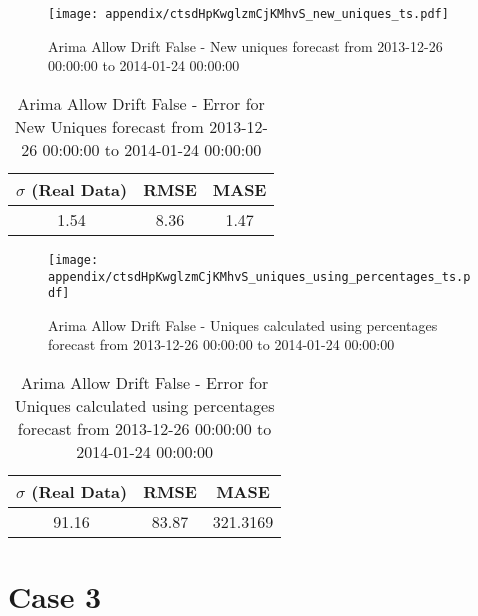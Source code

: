 \begin{figure}[H] \begin{center} \leavevmode
\texttt{[image: appendix/ctsdHpKwglzmCjKMhvS\_new\_uniques\_ts.pdf]} \caption{
Arima Allow Drift False - New uniques forecast from 2013-12-26 00:00:00 to 2014-01-24 00:00:00} \label{fig:appendix/ctsdHpKwglzmCjKMhvS_new_uniques_ts.pdf} \end{center}
\end{figure}

\begin{table}[H]
\centering
\footnotesize
\begin{tabular}{ccc}
$\sigma$ (Real Data) & RMSE & MASE   \\ \hline
1.54 & 8.36 & 1.47 \\
\end{tabular}

\vspace{0.5cm}

\caption{
Arima Allow Drift False - Error for New Uniques forecast from 2013-12-26 00:00:00 to 2014-01-24 00:00:00}
\end{table}

\begin{figure}[H] \begin{center} \leavevmode
\texttt{[image: appendix/ctsdHpKwglzmCjKMhvS\_uniques\_using\_percentages\_ts.pdf]} \caption{
Arima Allow Drift False - Uniques calculated using percentages forecast from 2013-12-26 00:00:00 to 2014-01-24 00:00:00} \label{fig:appendix/ctsdHpKwglzmCjKMhvS_uniques_using_percentages_ts.pdf} \end{center}
\end{figure}

\begin{table}[H]
\centering
\footnotesize
\begin{tabular}{ccc}
$\sigma$ (Real Data) & RMSE & MASE   \\ \hline
91.16 & 83.87 & 321.3169 \\
\end{tabular}

\vspace{0.5cm}

\caption{
Arima Allow Drift False - Error for Uniques calculated using percentages forecast from 2013-12-26 00:00:00 to 2014-01-24 00:00:00}
\end{table}

\chapter{Case 3}\label{ap:case3}

